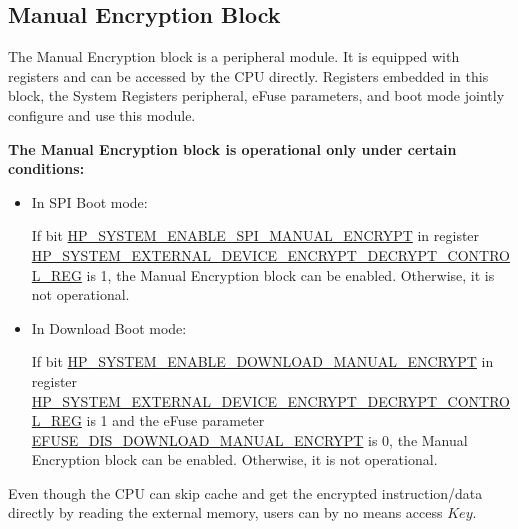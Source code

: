 \documentclass[main\_\_EN.tex]{subfiles}
\begin{document}
\subsection{Manual Encryption Block}

The Manual Encryption block is a peripheral module. It is equipped with registers and can be accessed by the CPU directly. Registers embedded in this block, the System Registers peripheral, eFuse parameters, and boot mode jointly configure and use this module.

\textbf{The Manual Encryption block is operational only under certain conditions:}

\begin{itemize}

    \item In SPI Boot mode:

    If bit \hyperref[fielddesc:HPSYSTEMENABLESPIMANUALENCRYPT]{HP\_SYSTEM\_ENABLE\_SPI\_MANUAL\_ENCRYPT} in register\\ \hyperref[regdesc:HPSYSTEMEXTERNALDEVICEENCRYPTDECRYPTCONTROLREG]{HP\_SYSTEM\_EXTERNAL\_DEVICE\_ENCRYPT\_DECRYPT\_CONTROL\_REG} is 1, the Manual Encryption block can be enabled. Otherwise, it is not operational.

    \item In Download Boot mode:

    If bit \hyperref[fielddesc:HPSYSTEMENABLEDOWNLOADMANUALENCRYPT]{HP\_SYSTEM\_ENABLE\_DOWNLOAD\_MANUAL\_ENCRYPT} in register\\ \hyperref[regdesc:HPSYSTEMEXTERNALDEVICEENCRYPTDECRYPTCONTROLREG]{HP\_SYSTEM\_EXTERNAL\_DEVICE\_ENCRYPT\_DECRYPT\_CONTROL\_REG} is 1 and the eFuse parameter\\ \hyperref[fielddesc:EFUSEDISDOWNLOADMANUALENCRYPT]{EFUSE\_DIS\_DOWNLOAD\_MANUAL\_ENCRYPT} is 0, the Manual Encryption block can be enabled. Otherwise, it is not operational.

\end{itemize}


\begin{tiplisting}
\vspace{-2em}
\begin{enumerate}
Even though the CPU can skip cache and get the encrypted instruction/data directly by reading the external memory, users can by no means access \begin{math}\mathit{Key}\end{math}.
\end{enumerate}
\end{tiplisting}
\end{document}
